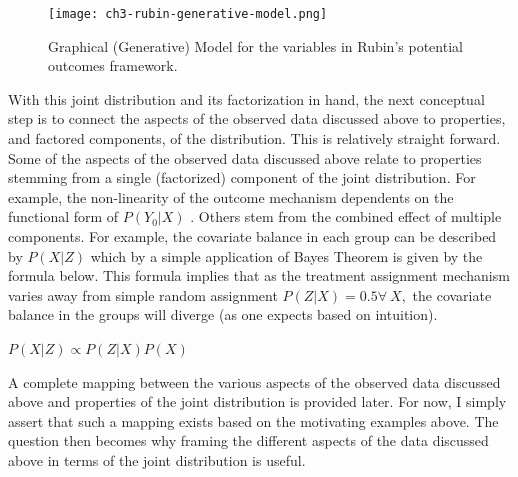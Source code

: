\documentclass[../main.tex]{subfiles}
\begin{document}
\vspace{\baselineskip}

\begin{figure}[ht!]
    \centering
    \texttt{[image: ch3-rubin-generative-model.png]}
    \caption{Graphical (Generative) Model for the variables in Rubin’s potential outcomes framework.}
    \label{fig:rubin_generative_model}
\end{figure}

\vspace{\baselineskip}
With this joint distribution and its factorization in hand, the next conceptual step is to connect the aspects of the observed data discussed above to properties, and factored components, of the distribution. This is relatively straight forward. Some of the aspects of the observed data discussed above relate to properties stemming from a single (factorized) component of the joint distribution. For example, the non-linearity of the outcome mechanism dependents on the functional form of  \( P \left( Y_{0}  \vert  X \right)  \) . Others stem from the combined effect of multiple components. For example, the covariate balance in each group can be described by  \( P \left( X  \vert  Z \right)  \)  which by a simple application of Bayes Theorem is given by the formula below. This formula implies that as the treatment assignment mechanism varies away from simple random assignment  \( P \left( Z \vert X \right)  = 0.5  \forall ~X, \)  the covariate balance in the groups will diverge (as one expects based on intuition).\par


\vspace{\baselineskip}
\begin{adjustwidth}{0.5in}{0.0in}
 \( P \left( X  \vert  Z \right)  \propto P \left( Z  \vert  X \right) P \left( X \right)  \) \par
\end{adjustwidth}

\vspace{\baselineskip}
A complete mapping between the various aspects of the observed data discussed above and properties of the joint distribution is provided later. For now, I simply assert that such a mapping exists based on the motivating examples above. The question then becomes why framing the different aspects of the data discussed above in terms of the joint distribution is useful.\par
\end{document}
